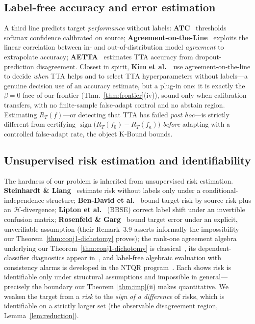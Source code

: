 \documentclass[conference]{IEEEtran}
\theoremstyle{plain}
\theoremstyle{definition}
\newcommand{\sign}{\operatorname{sign}}
\begin{document}
\subsection{Label-free accuracy and error estimation}
A third line predicts target \emph{performance} without labels: \textbf{ATC}~\cite{garg2022atc} thresholds
softmax confidence calibrated on source; \textbf{Agreement-on-the-Line}~\cite{baek2022aol,miller2021aol} exploits the linear
correlation between in- and out-of-distribution model \emph{agreement} to extrapolate
accuracy; \textbf{AETTA}~\cite{lee2024aetta} estimates TTA accuracy from dropout-prediction disagreement.
Closest in spirit, \textbf{Kim et al.}~\cite{kim2024taol}\ use agreement-on-the-line to decide \emph{when} TTA
helps and to select TTA hyperparameters without labels---a genuine decision use of an
accuracy estimate, but a plug-in one: it is exactly the $\beta{=}0$ face of our frontier
(Thm.~\ref{thm:frontier}(iv)), sound only when calibration transfers, with no finite-sample
false-adapt control and no abstain region.
Estimating $R_T(f)$---or detecting that TTA has failed \emph{post hoc}---is strictly different
from certifying $\sign\big(R_T(f_0)-R_T(f_a)\big)$ \emph{before} adapting with a controlled
false-adapt rate, the object K-Bound bounds.

\subsection{Unsupervised risk estimation and identifiability}
The hardness of our problem is inherited from unsupervised risk estimation.
\textbf{Steinhardt \& Liang}~\cite{steinhardt2016} estimate risk without labels only under a conditional-independence
structure; \textbf{Ben-David et al.}~\cite{bendavid2010theory,bendavid2010impossibility} bound target risk by source risk plus an
$\mathcal{H}$-divergence; \textbf{Lipton et al.}~\cite{lipton2018bbse} (BBSE) correct label shift under an invertible
confusion matrix; \textbf{Rosenfeld \& Garg}~\cite{rosenfeld2023dis2} bound target error under an explicit,
unverifiable assumption (their Remark~3.9 asserts informally the impossibility our
Theorem~\ref{thm:conj1-dichotomy} proves); the rank-one agreement algebra underlying our
Theorem~\ref{thm:conj1-dichotomy} is classical~\cite{parisi2014,jaffe2015,platanios2014,ibrahim2019},
its dependent-classifier diagnostics appear in~\cite{jaffe2016}, and label-free
algebraic evaluation with consistency alarms is developed in the NTQR
program~\cite{corradaemmanuel2024}. Each shows risk is identifiable only under structural assumptions and
impossible in general---precisely the boundary our Theorem~\ref{thm:imp}(ii) makes
quantitative. We weaken the target from a \emph{risk} to the \emph{sign of a difference} of
risks, which is identifiable on a strictly larger set (the observable disagreement region,
Lemma~\ref{lem:reduction}).
\end{document}
